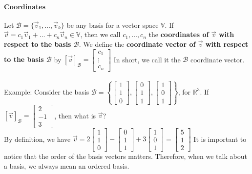 \documentclass[10pt,letter]{article}
\begin{document}
\paragraph{Coordinates} Let $\mathcal{B} =\{\vec{v}_1,\ldots,\vec{v}_k\}$ be any basis for a vector space $\mathbb{V}$. If $\vec{v}=c_1\vec{v}_1+\ldots+c_n\vec{v}_n\in\mathbb{V}$, then we call $c_1,\ldots,c_n$ the \textbf{coordinates of $\vec{v}$ with respect to the basis $\mathcal{B}$}. We define the \textbf{coordinate vector of $\vec{v}$ with respect to the basis $\mathcal{B}$} by $[\vec{v}]_\mathcal{B}=\begin{bmatrix}c_1\\\vdots\\c_n\end{bmatrix}$ In short, we call it the $\mathcal{B}$ coordinate vector. \\ \\
Example: Consider the basis $\mathcal{B}=\left\{\begin{bmatrix}1\\1\\0\end{bmatrix},\begin{bmatrix}0\\1\\1\end{bmatrix},\begin{bmatrix}1\\0\\1\end{bmatrix}\right\}$, for $\mathbb{R}^3$. If $[\vec{v}]_\mathcal{B}=\begin{bmatrix}2\\-1\\3\end{bmatrix}$, then what is $\vec{v}$? \\ 
By definition, we have $\vec{v}=2\begin{bmatrix}1\\1\\0\end{bmatrix}-\begin{bmatrix}0\\1\\1\end{bmatrix}+3\begin{bmatrix}1\\0\\1\end{bmatrix}=\begin{bmatrix}5\\1\\2\end{bmatrix}$ It is important to notice that the order of the basis vectors matters. Therefore, when we talk about a basis, we always mean an ordered basis. \\ \\
\end{document}
